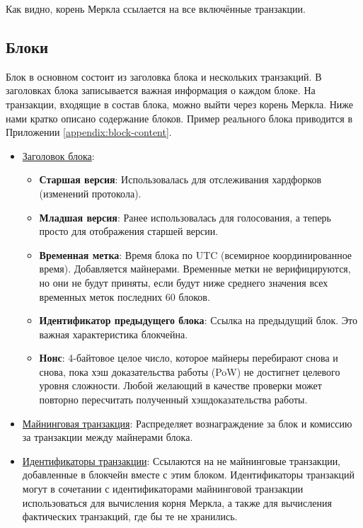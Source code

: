 Как видно, корень Меркла ссылается на все включённые транзакции.



\newpage
\subsection{Блоки}
\label{subsec:blocks} %

Блок в основном состоит из заголовка блока и нескольких транзакций. В заголовках блока записывается важная информация о каждом блоке. На транзакции, входящие в состав блока, можно выйти через корень Меркла. Ниже нами кратко описано содержание блоков. Пример реального блока приводится в Приложении \ref{appendix:block-content}.
\begin{itemize}
    \item \underline{Заголовок блока}:
    \begin{itemize}
        \item \textbf{Старшая версия}: Использовалась для отслеживания хардфорков (изменений протокола).
        \item \textbf{Младшая версия}: Ранее использовалась для голосования, а теперь просто для отображения старшей версии.
        \item \textbf{Временная метка}: Время блока по UTC (всемирное координированное время). Добавляется майнерами. Временные метки не верифицируются, но они не будут приняты, если будут ниже среднего значения всех временных меток последних 60 блоков. %
        \item \textbf{Идентификатор предыдущего блока}: Ссылка на предыдущий блок. Это важ\-ная характеристика блокчейна.
        \item \textbf{Нонс}: 4-байтовое целое число, которое майнеры перебирают снова и снова, пока хэш доказательства работы (PoW) не достигнет целевого уровня сложности. Любой желающий в качестве проверки может повторно пересчитать полученный хэш\linebreak доказательства работы.
    \end{itemize}
    \item \underline{Майнинговая транзакция}: Распределяет вознаграждение за блок и комиссию за тран\-закции между майнерами блока.
    \item \underline{Идентификаторы транзакции}: Ссылаются на не майнинговые транзакции, добавленные в блокчейн вместе с этим блоком. Идентификаторы транзакций могут в сочетании с идентификаторами майнинговой транзакции использоваться для вычисления корня Меркла, а также для вычисления фактических транзакций, где бы те не хранились.\\
\end{itemize}\vspace{.05cm}

